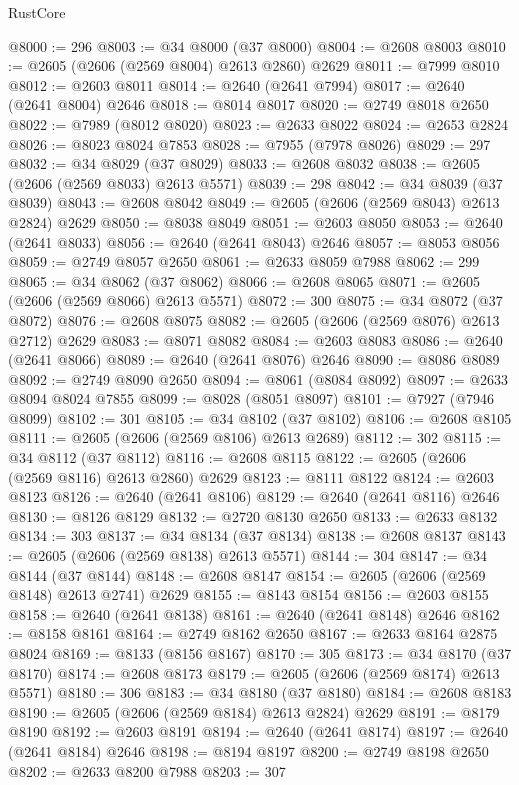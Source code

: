 \begin{lexlean}{RustCore}
\begin{coremodule}
@8000 := 296
@8003 := @34 @8000 (@37 @8000)
@8004 := @2608 @8003
@8010 := @2605 (@2606 (@2569 @8004) @2613 @2860) @2629
@8011 := @7999 @8010
@8012 := @2603 @8011
@8014 := @2640 (@2641 @7994)
@8017 := @2640 (@2641 @8004) @2646
@8018 := @8014 @8017
@8020 := @2749 @8018 @2650
@8022 := @7989 (@8012 @8020)
@8023 := @2633 @8022
@8024 := @2653 @2824
@8026 := @8023 @8024 @7853
@8028 := @7955 (@7978 @8026)
@8029 := 297
@8032 := @34 @8029 (@37 @8029)
@8033 := @2608 @8032
@8038 := @2605 (@2606 (@2569 @8033) @2613 @5571)
@8039 := 298
@8042 := @34 @8039 (@37 @8039)
@8043 := @2608 @8042
@8049 := @2605 (@2606 (@2569 @8043) @2613 @2824) @2629
@8050 := @8038 @8049
@8051 := @2603 @8050
@8053 := @2640 (@2641 @8033)
@8056 := @2640 (@2641 @8043) @2646
@8057 := @8053 @8056
@8059 := @2749 @8057 @2650
@8061 := @2633 @8059 @7988
@8062 := 299
@8065 := @34 @8062 (@37 @8062)
@8066 := @2608 @8065
@8071 := @2605 (@2606 (@2569 @8066) @2613 @5571)
@8072 := 300
@8075 := @34 @8072 (@37 @8072)
@8076 := @2608 @8075
@8082 := @2605 (@2606 (@2569 @8076) @2613 @2712) @2629
@8083 := @8071 @8082
@8084 := @2603 @8083
@8086 := @2640 (@2641 @8066)
@8089 := @2640 (@2641 @8076) @2646
@8090 := @8086 @8089
@8092 := @2749 @8090 @2650
@8094 := @8061 (@8084 @8092)
@8097 := @2633 @8094 @8024 @7855
@8099 := @8028 (@8051 @8097)
@8101 := @7927 (@7946 @8099)
@8102 := 301
@8105 := @34 @8102 (@37 @8102)
@8106 := @2608 @8105
@8111 := @2605 (@2606 (@2569 @8106) @2613 @2689)
@8112 := 302
@8115 := @34 @8112 (@37 @8112)
@8116 := @2608 @8115
@8122 := @2605 (@2606 (@2569 @8116) @2613 @2860) @2629
@8123 := @8111 @8122
@8124 := @2603 @8123
@8126 := @2640 (@2641 @8106)
@8129 := @2640 (@2641 @8116) @2646
@8130 := @8126 @8129
@8132 := @2720 @8130 @2650
@8133 := @2633 @8132
@8134 := 303
@8137 := @34 @8134 (@37 @8134)
@8138 := @2608 @8137
@8143 := @2605 (@2606 (@2569 @8138) @2613 @5571)
@8144 := 304
@8147 := @34 @8144 (@37 @8144)
@8148 := @2608 @8147
@8154 := @2605 (@2606 (@2569 @8148) @2613 @2741) @2629
@8155 := @8143 @8154
@8156 := @2603 @8155
@8158 := @2640 (@2641 @8138)
@8161 := @2640 (@2641 @8148) @2646
@8162 := @8158 @8161
@8164 := @2749 @8162 @2650
@8167 := @2633 @8164 @2875 @8024
@8169 := @8133 (@8156 @8167)
@8170 := 305
@8173 := @34 @8170 (@37 @8170)
@8174 := @2608 @8173
@8179 := @2605 (@2606 (@2569 @8174) @2613 @5571)
@8180 := 306
@8183 := @34 @8180 (@37 @8180)
@8184 := @2608 @8183
@8190 := @2605 (@2606 (@2569 @8184) @2613 @2824) @2629
@8191 := @8179 @8190
@8192 := @2603 @8191
@8194 := @2640 (@2641 @8174)
@8197 := @2640 (@2641 @8184) @2646
@8198 := @8194 @8197
@8200 := @2749 @8198 @2650
@8202 := @2633 @8200 @7988
@8203 := 307

\end{coremodule}
\end{lexlean}
